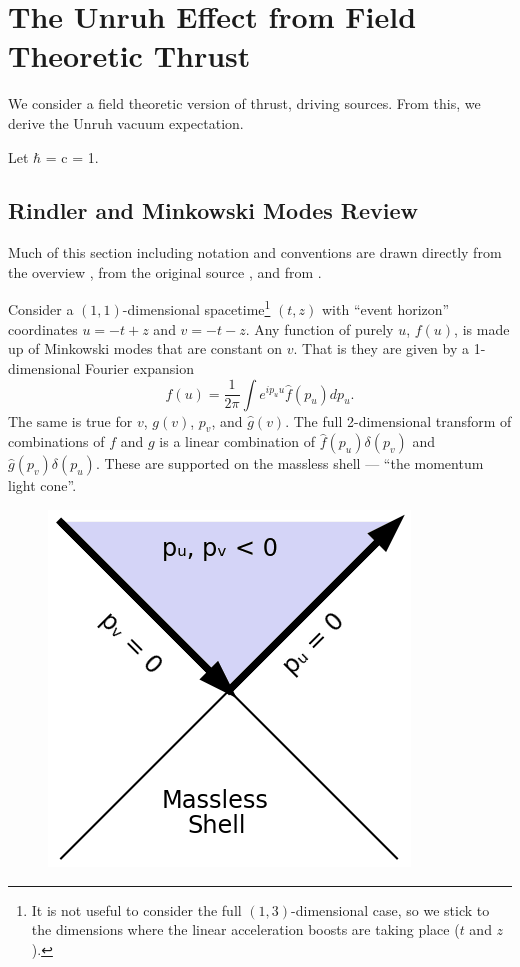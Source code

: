 \documentclass[12pt,a4paper]{article}
\begin{document}
\section{The Unruh Effect from Field Theoretic Thrust}
We consider a field theoretic version of thrust, driving sources.  From this, we derive the Unruh vacuum expectation.


Let $\hbar$ = c = 1.
\subsection{Rindler and Minkowski Modes Review}
Much of this section including notation and conventions are drawn directly from the overview \cite{Frodden}, from the original source \cite{unruh}, and from \cite{beisert}.

Consider a $(1,1)$-dimensional spacetime\footnote{It is not useful to consider the full $(1,3)$-dimensional case, so we stick to the dimensions where the linear acceleration boosts are taking place ($t$ and $z$).} $(t,z)$ with ``event horizon'' coordinates $u = -t + z$ and $v = -t - z$.   Any function of purely $u$, $f(u)$, is made up of Minkowski modes that are constant on $v$.  That is they are given by a 1-dimensional Fourier expansion
\[
f(u) = \frac{1}{2\pi} \int{e^{i p_u u} \hat{f}(p_u) dp_u}.
\]
The same is true for $v$, $g(v)$, $p_v$, and $\hat{g}(v)$.  The full 2-dimensional transform of combinations of $f$ and $g$ is a linear combination of $\hat{f}(p_u) \delta(p_v)$ and $\hat{g}(p_v) \delta(p_u)$.  These are supported on the massless shell --- ``the momentum light cone''.

\begin{figure}[h]
\centering
\includegraphics[scale=1.0]{massless_shell.png}
\caption{}
\label{masslessshell}
\end{figure}
\end{document}
